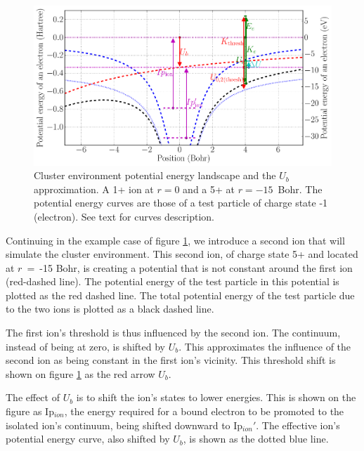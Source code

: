 \begin{figure}
    \begin{center}
    \includegraphics[width=\figurewidth]{figures/potential_landscape}
    \end{center}
    \caption{\label{fig:md:Vb}Cluster environment potential energy landscape
             and the $U_b$ approximation. A 1+ ion at $r=0$ and a 5+ at
             $r=-15$~Bohr. The potential energy curves are those of a test
             particle of charge state -1 (electron). See text for curves
             description.}
\end{figure}


Continuing in the example case of figure \ref{fig:md:Vb}, we introduce a
second ion that will simulate the cluster environment. This second ion, of
charge state 5+ and located at $r$~=~-15 Bohr, is creating a
potential that is not constant around the first ion (red-dashed line). The potential energy of
the test particle in this potential is plotted as the red dashed line. The total
potential energy of the test particle due to the two ions is plotted as a black
dashed line.

The first ion's threshold is thus influenced by the second ion. The continuum,
instead of being at zero, is shifted by $U_b$. This approximates the
influence of the second ion as being constant in the first ion's vicinity. This
threshold shift is shown on figure \ref{fig:md:Vb} as the red arrow $U_b$.

The effect of $U_b$ is to shift the ion's states to lower energies. This is
shown on the figure as Ip$_{ion}$, the energy required for a bound electron
to be promoted to the isolated ion's continuum, being shifted downward to
Ip$_{ion}'$. The effective ion's potential energy curve, also shifted by $U_b$,
is shown as the dotted blue line.

